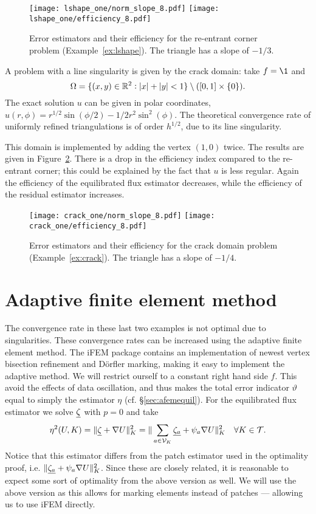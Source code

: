 \documentclass[thesis.tex]{subfiles}
\begin{document}
\begin{figure}
  \centering
  \texttt{[image: lshape\_one/norm\_slope\_8.pdf]}
  \texttt{[image: lshape\_one/efficiency\_8.pdf]}
  \caption{Error estimators and their efficiency for the re-entrant corner problem (Example~\ref{ex:lshape}). The triangle has a slope of $-1/3$.}
  \label{fig:lshapeone}
\end{figure}

\begin{exmp}
  \label{ex:crack}
A problem with a line singularity is given by the crack domain: take $f = \1$ and
\[
  \Omega=\{(x,y) \in \mathbb{R}^2 : |x|+|y|<1\}\setminus ([0,1] \times \set{0}).
\]
The exact solution $u$ can be given in polar coordinates, $u(r, \phi) = r^{1/2}\sin(\phi/2) - 1/2 r^2 \sin^2 (\phi)$.
The theoretical convergence rate of uniformly refined triangulations is of order $h^{1/2}$, due to its line singularity. 
\end{exmp}

This
domain is implemented by adding the vertex $(1,0)$ twice.  
The results are given in Figure~\ref{fig:crackone}.
There is a drop in the efficiency index compared to the re-entrant corner; this could
be explained by the fact that $u$ is less regular. Again the efficiency of the equilibrated flux estimator decreases, while the efficiency
of the residual estimator increases.
\begin{figure}
  \centering
  \texttt{[image: crack\_one/norm\_slope\_8.pdf]}
  \texttt{[image: crack\_one/efficiency\_8.pdf]}
  \caption{Error estimators and their efficiency for the crack domain problem (Example~\ref{ex:crack}). The triangle has a slope of $-1/4$.}
  \label{fig:crackone}
\end{figure}

\section{Adaptive finite element method}
The convergence rate in these last two examples is not optimal due to singularities.
These convergence rates can be increased using the adaptive finite element method. The iFEM package contains
an implementation of newest vertex bisection refinement and D\"orfler marking, making it easy
to implement the adaptive method. We will restrict ourself to a constant right hand side $f$. This
avoid the effects of data oscillation, and thus makes the total error indicator $\vartheta$ equal to 
simply the estimator $\eta$ (cf. \S\ref{sec:afemequil}). For the equilibrated flux estimator we 
solve $\underline{\zeta}$ with $p=0$ and take
\[
  \eta^2(U, K) = \|  \underline{\zeta} + \nabla U \|^2_{K} = \| \sum_{a \in \mathcal{V}_K} \underline{\zeta_a} + \psi_a \nabla U \|^2_{K} \quad \forall K \in \mathcal{T}.
\]
Notice that this estimator differs from the patch estimator used in the optimality proof, i.e. $\| \underline{\zeta_a} + \psi_a \nabla U \|^2_K$.
Since these are closely related, it is reasonable to expect some sort of optimality from the above version as well. We will use
the above version as this allows for marking elements instead of patches --- allowing us to use iFEM directly. 
\end{document}
